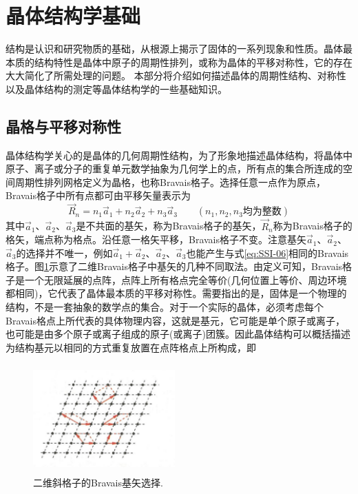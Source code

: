 \section{晶体结构学基础}
结构是认识和研究物质的基础，从根源上揭示了固体的一系列现象和性质。晶体最本质的结构特性是晶体中原子的周期性排列，或称为晶体的平移对称性，它的存在大大简化了所需处理的问题。%
本部分将介绍如何描述晶体的周期性结构、对称性以及晶体结构的测定等晶体结构学的一些基础知识。

\subsection{晶格与平移对称性}
晶体结构学关心的是晶体的几何周期性结构，为了形象地描述晶体结构，将晶体中原子、离子或分子的重复单元数学抽象为几何学上的点，所有点的集合所连成的空间周期性排列网格定义为晶格，也称Bravais格子。选择任意一点作为原点，Bravais格子中所有点都可由平移矢量表示为
\begin{equation}
	\vec R_n=n_1\vec a_1+n_2\vec a_2+n_3\vec a_3\qquad (n_1,n_2,n_3\mbox{均为整数})
	\label{eq:SSI-06}
\end{equation}
其中$\vec a_1$、$\vec a_2$、$\vec a_3$是不共面的基矢，称为Bravais格子的基矢，$\vec R_n$称为Bravais格子的格矢，端点称为格点。沿任意一格矢平移，Bravais格子不变。注意基矢$\vec a_1$、$\vec a_2$、$\vec a_3$的选择并不唯一，例如$\vec a_1+\vec a_2$、$\vec a_2$、$\vec a_3$也能产生与式\eqref{eq:SSI-06}相同的Bravais格子。图\ref{Fig:Bravais_Lattice-basis}示意了二维Bravais格子中基矢的几种不同取法。由定义可知，Bravais格子是一个无限延展的点阵，点阵上所有格点完全等价(几何位置上等价、周边环境都相同)，它代表了晶体最本质的平移对称性。需要指出的是，固体是一个物理的结构，不是一套抽象的数学点的集合。对于一个实际的晶体，必须考虑每个Bravais格点上所代表的具体物理内容，这就是基元，它可能是单个原子或离子，也可能是由多个原子或离子组成的原子(或离子)团簇。因此晶体结构可以概括描述为结构基元以相同的方式重复放置在点阵格点上所构成，即
\begin{figure}[h!]
\centering
\vspace*{-0.05in}
\includegraphics[height=1.65in,width=2.15in,viewport=0 0 45 30,clip]{Figures/Bravais_Lattice-basis_set.png}
\caption{\small \textrm{二维斜格子的Bravais基矢选择.}}%
\label{Fig:Bravais_Lattice-basis}
\end{figure}
